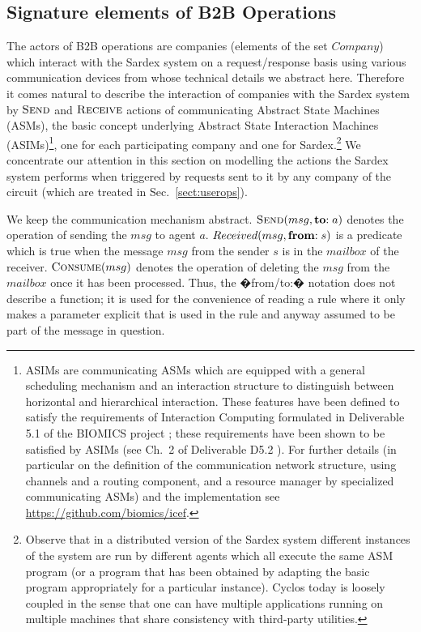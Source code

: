 \subsection{Signature elements of B2B Operations}
\label{signaturepaymtop}
The actors of B2B operations are companies (elements of the set $Company$) which interact with the Sardex system on a request/response basis using various communication devices from whose technical details we abstract here. Therefore it comes natural to describe the interaction of companies with the Sardex system by $\hbox{\sc Send}$ and $\hbox{\sc Receive}$ actions of communicating Abstract State Machines (ASMs), the basic concept underlying Abstract State Interaction Machines (ASIMs)\footnote{ASIMs are communicating ASMs which are equipped with a general scheduling mechanism and an interaction structure to distinguish between horizontal and hierarchical interaction. These features have been defined to satisfy the requirements of Interaction Computing formulated in Deliverable 5.1 of the BIOMICS project  \cite{BIOMICSD51}; these requirements have been shown to be satisfied by ASIMs (see Ch.\ 2 of Deliverable D5.2 \cite{BIOMICSD52}). For further details (in particular on the definition of the communication network structure, using channels and a routing component, and a resource manager by specialized communicating ASMs) and the implementation see \url{https://github.com/biomics/icef}.}, one for each participating company and one for Sardex.\footnote{Observe that in a distributed version of the Sardex system different instances of the system are run by different agents which all execute the same ASM program (or a program that has been obtained by adapting the basic program appropriately for a particular instance). Cyclos today is loosely coupled in the sense that one can have multiple applications running on multiple machines that share consistency with third-party utilities.} We concentrate our attention in this section on modelling the actions the Sardex system performs when triggered by requests sent to it by any company of the circuit (which are treated in Sec.~\ref{sect:userops}).

We keep the communication mechanism abstract. $\hbox{\sc Send}(msg,\mathrel{\mathbf{to}} :a)$ denotes the operation of sending the $msg$ to agent $a$. 
$Received(msg,\mathrel{\mathbf{from}} :s)$ is a predicate which is true when the message $msg$ from the sender $s$ is in the $mailbox$ of the receiver. $\hbox{\sc Consume}(msg)$ denotes the operation of deleting the $msg$ from the $mailbox$ once it has been processed. Thus,
the �from/to:� notation does not describe a function; it is used for the convenience of reading a rule where it only makes a parameter explicit that is used in the rule and anyway assumed to be part of the message in question.

